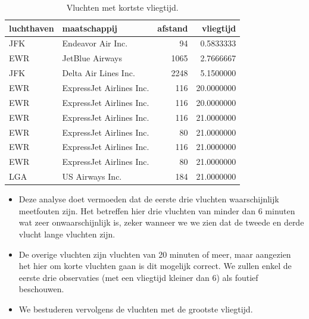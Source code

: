 \documentclass[]{tufte-book}
\newenvironment{Shaded}{}{}
\newcommand{\DecValTok}[1]{\textcolor[rgb]{0.25,0.63,0.44}{#1}}
\newcommand{\KeywordTok}[1]{\textcolor[rgb]{0.00,0.44,0.13}{\textbf{#1}}}
\newcommand{\NormalTok}[1]{#1}
\newcommand{\OperatorTok}[1]{\textcolor[rgb]{0.40,0.40,0.40}{#1}}
\newcommand{\StringTok}[1]{\textcolor[rgb]{0.25,0.44,0.63}{#1}}
\providecommand{\tightlist}{%
  \setlength{\itemsep}{0pt}\setlength{\parskip}{0pt}}
\begin{document}
\begin{Shaded}
\end{Shaded}

\begin{table}

\caption{\label{tab:5-11b}Vluchten met kortste vliegtijd.}
\centering
\fontsize{10}{12}\selectfont
\begin{tabular}[t]{llrr}
\toprule
luchthaven & maatschappij & afstand & vliegtijd\\
\midrule
JFK & Endeavor Air Inc. & 94 & 0.5833333\\
EWR & JetBlue Airways & 1065 & 2.7666667\\
JFK & Delta Air Lines Inc. & 2248 & 5.1500000\\
EWR & ExpressJet Airlines Inc. & 116 & 20.0000000\\
EWR & ExpressJet Airlines Inc. & 116 & 20.0000000\\
\addlinespace
EWR & ExpressJet Airlines Inc. & 116 & 21.0000000\\
EWR & ExpressJet Airlines Inc. & 80 & 21.0000000\\
EWR & ExpressJet Airlines Inc. & 116 & 21.0000000\\
EWR & ExpressJet Airlines Inc. & 80 & 21.0000000\\
LGA & US Airways Inc. & 184 & 21.0000000\\
\bottomrule
\end{tabular}
\end{table}

\begin{itemize}
\tightlist
\item
  Deze analyse doet vermoeden dat de eerste drie vluchten waarschijnlijk meetfouten zijn. Het betreffen hier drie vluchten van minder dan 6 minuten wat zeer onwaarschijnlijk is, zeker wanneer we we zien dat de tweede en derde vlucht lange vluchten zijn.
\item
  De overige vluchten zijn vluchten van 20 minuten of meer, maar aangezien het hier om korte vluchten gaan is dit mogelijk correct. We zullen enkel de eerste drie observaties (met een vliegtijd kleiner dan 6) als foutief beschouwen.
\item
  We bestuderen vervolgens de vluchten met de grootste vliegtijd.
\end{itemize}
\end{document}
